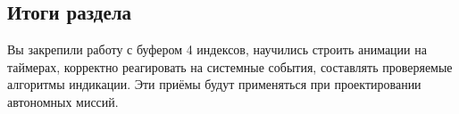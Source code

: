\subsection*{Итоги раздела}
Вы закрепили работу с буфером 4 индексов, научились строить анимации на таймерах, корректно реагировать на системные события, составлять проверяемые алгоритмы индикации. Эти приёмы будут применяться при проектировании автономных миссий.
